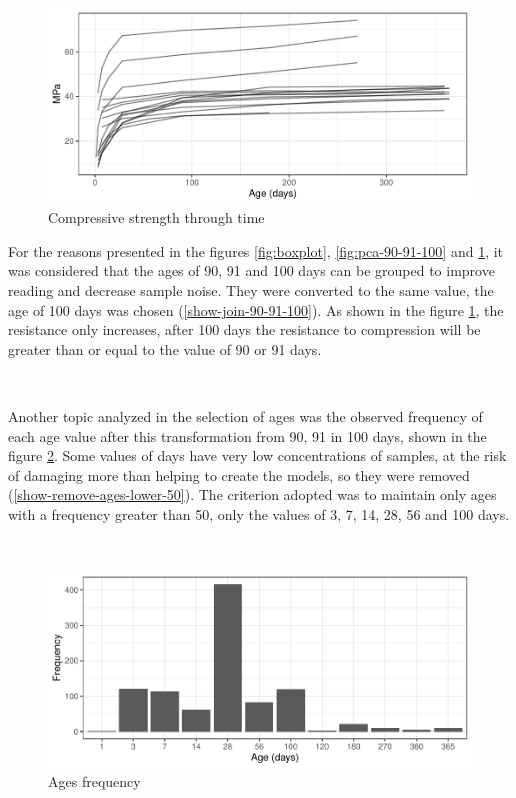 \documentclass[]{article}
\begin{document}
\begin{figure}

{\centering \includegraphics{CopyOfcapstone_files/figure-latex/mpa-on-time-1} 

}

\caption{Compressive strength through time}\label{fig:mpa-on-time}
\end{figure}

For the reasons presented in the figures \ref{fig:boxplot},
\ref{fig:pca-90-91-100} and \ref{fig:mpa-on-time}, it was considered
that the ages of 90, 91 and 100 days can be grouped to improve reading
and decrease sample noise. They were converted to the same value, the
age of 100 days was chosen (\ref{show-join-90-91-100}). As shown in the
figure \ref{fig:mpa-on-time}, the resistance only increases, after 100
days the resistance to compression will be greater than or equal to the
value of 90 or 91 days.

~

Another topic analyzed in the selection of ages was the observed
frequency of each age value after this transformation from 90, 91 in 100
days, shown in the figure \ref{fig:freq-ages}. Some values of days have
very low concentrations of samples, at the risk of damaging more than
helping to create the models, so they were removed
(\ref{show-remove-ages-lower-50}). The criterion adopted was to maintain
only ages with a frequency greater than 50, only the values of 3, 7, 14,
28, 56 and 100 days.

~

\begin{figure}

{\centering \includegraphics{CopyOfcapstone_files/figure-latex/freq-ages-1} 

}

\caption{Ages frequency}\label{fig:freq-ages}
\end{figure}
\end{document}
